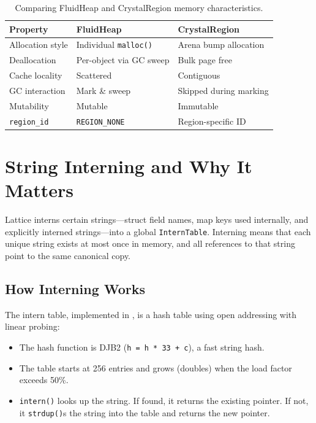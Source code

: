 \begin{table}[h]
\centering
\begin{tabular}{lll}
\toprule
\textbf{Property} & \textbf{FluidHeap} & \textbf{CrystalRegion} \\
\midrule
Allocation style & Individual \lstinline|malloc()| & Arena bump allocation \\
Deallocation & Per-object via GC sweep & Bulk page free \\
Cache locality & Scattered & Contiguous \\
GC interaction & Mark \& sweep & Skipped during marking \\
Mutability & Mutable & Immutable \\
\lstinline|region_id| & \lstinline|REGION_NONE| & Region-specific ID \\
\bottomrule
\end{tabular}
\caption{Comparing FluidHeap and CrystalRegion memory characteristics.}\label{tab:heap-vs-arena}
\end{table}

\section{String Interning and Why It Matters}\label{sec:string-interning}


Lattice interns certain strings---struct field names, map keys used internally, and explicitly interned strings---into a global \lstinline|InternTable|.
Interning means that each unique string exists at most once in memory, and all references to that string point to the same canonical copy.

\subsection{How Interning Works}

The intern table, implemented in , is a hash table using open addressing with linear probing:

\begin{itemize}
  \item The hash function is DJB2 (\lstinline|h = h * 33 + c|), a fast string hash.
  \item The table starts at 256 entries and grows (doubles) when the load factor exceeds 50\%.
  \item \lstinline|intern()| looks up the string. If found, it returns the existing pointer. If not, it \lstinline|strdup()|s the string into the table and returns the new pointer.
\end{itemize}

